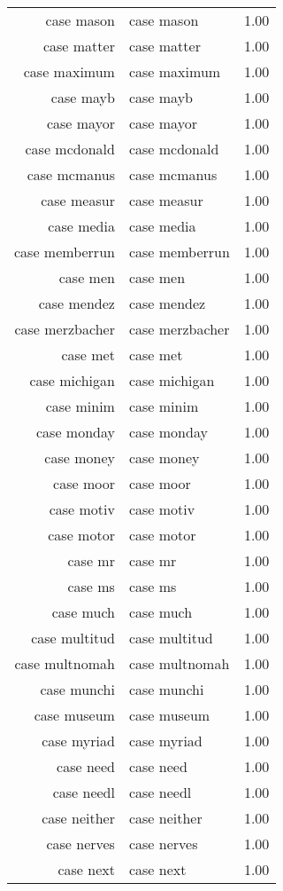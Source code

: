 \begin{table}[ht]
\begin{tabular}{rlr}
  case mason & case mason & 1.00 \\ 
  case matter & case matter & 1.00 \\ 
  case maximum & case maximum & 1.00 \\ 
  case mayb & case mayb & 1.00 \\ 
  case mayor & case mayor & 1.00 \\ 
  case mcdonald & case mcdonald & 1.00 \\ 
  case mcmanus & case mcmanus & 1.00 \\ 
  case measur & case measur & 1.00 \\ 
  case media & case media & 1.00 \\ 
  case memberrun & case memberrun & 1.00 \\ 
  case men & case men & 1.00 \\ 
  case mendez & case mendez & 1.00 \\ 
  case merzbacher & case merzbacher & 1.00 \\ 
  case met & case met & 1.00 \\ 
  case michigan & case michigan & 1.00 \\ 
  case minim & case minim & 1.00 \\ 
  case monday & case monday & 1.00 \\ 
  case money & case money & 1.00 \\ 
  case moor & case moor & 1.00 \\ 
  case motiv & case motiv & 1.00 \\ 
  case motor & case motor & 1.00 \\ 
  case mr & case mr & 1.00 \\ 
  case ms & case ms & 1.00 \\ 
  case much & case much & 1.00 \\ 
  case multitud & case multitud & 1.00 \\ 
  case multnomah & case multnomah & 1.00 \\ 
  case munchi & case munchi & 1.00 \\ 
  case museum & case museum & 1.00 \\ 
  case myriad & case myriad & 1.00 \\ 
  case need & case need & 1.00 \\ 
  case needl & case needl & 1.00 \\ 
  case neither & case neither & 1.00 \\ 
  case nerves & case nerves & 1.00 \\ 
  case next & case next & 1.00 \\ 

\end{tabular}
\end{table}
